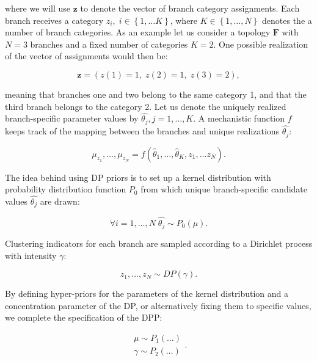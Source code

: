\noindent
where we will use $\mathbf{z}$ to denote the vector of branch category assignments.
Each branch receives a category $z_{i},\; i\in\left\{ 1,\ldots K\right\}$, where $K\in\left\{ 1,\ldots,N\right\}$ denotes the a number of branch categories.
As an example let us consider a topology $\mathbf{F}$ with $N=3$ branches and a fixed number of categories $K=2$.
One possible realization of the vector of assignments would then be:

$$\mathbf{z}=\left(z(1)=1,\; z(2)=1,\; z(3)=2\right),$$ 

\noindent
meaning that branches one and two belong to the same category 1, and that the third branch belongs to the category 2.
Let us denote the uniquely realized branch-specific parameter values by $\hat{\theta_{j}}, j=1,\ldots,K$.
A mechanistic function $f$ keeps track of the mapping between the branches and unique realizations $\hat{\theta_{j}}$:

\begin{equation}
\mu_{z_{1}},\ldots,\mu_{z_{N}}=f\left(\hat{\theta}_{1},\ldots,\hat{\theta}_{K},z_{1},\ldots z_{N}\right).
\label{eq:dpp2}
\end{equation}

\noindent
The idea behind using DP priors is to set up a kernel distribution with probability distribution function $P_{0}$ from which unique branch-specific candidate values $\hat{\theta_{j}}$ are drawn:

\begin{equation}
\forall i=1,\ldots,N\;\hat{\theta_{j}}\sim P_{0}\left(\mu\right).
\label{eq:dpp3}
\end{equation}

\noindent
Clustering indicators for each branch are sampled according to a Dirichlet process with intensity $\gamma$:

\begin{equation}
z_{1},\ldots,z_{N}\sim DP(\gamma).
\label{eq:dpp4}
\end{equation}

\noindent
By defining hyper-priors for the parameters of the kernel distribution and a concentration parameter of the DP, or alternatively fixing them to specific values, we complete the specification of the DPP:

\begin{equation}
\begin{array}{c}
\mu\sim P_{1}(\ldots)\\
\gamma\sim P_{2}(\ldots)
\end{array}.
\label{eq:dpp5}
\end{equation}

